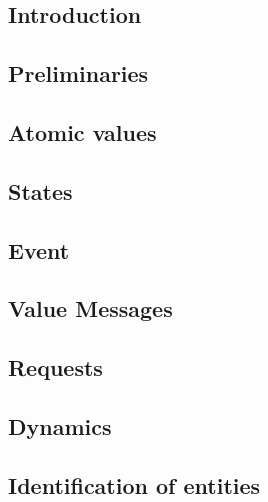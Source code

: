 \subsection{Introduction}
\label{sec:play:intro}


\subsection{Preliminaries}
\label{sec:play:prelim}



\subsection{Atomic values}
\label{sec:play:atomic}


\subsection{States}
\label{sec:play:states}


\subsection{Event}
\label{sec:play:events}


\subsection{Value Messages}
\label{sec:play:value_msgs}


\subsection{Requests}
\label{sec:play:requests}


\subsection{Dynamics}
\label{sec:play:dynamics}


\subsection{Identification of entities}
\label{sec:play:ids}

